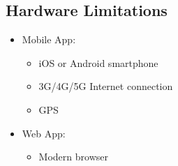 \subsection{Hardware Limitations}

\begin{itemize}
	\item Mobile App: 
	\begin{itemize}
		\item iOS or Android smartphone
		\item 3G/4G/5G Internet connection
		\item GPS
	\end{itemize}
	\item Web App:
	\begin{itemize}
		\item Modern browser
	\end{itemize}
\end{itemize}

 
 